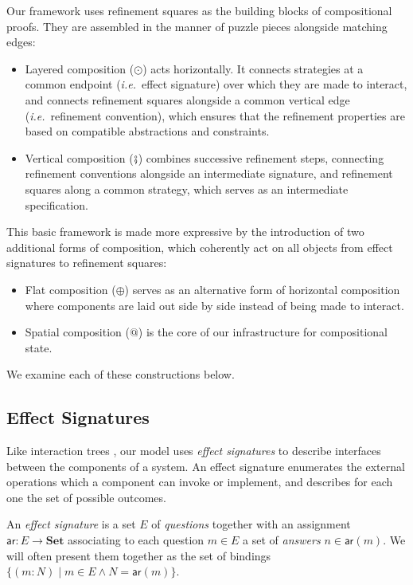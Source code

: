 \documentclass[acmsmall,nonacm]{acmart}
\newcommand{\kw}[1]{\ensuremath{ \mathsf{#1} }}
\begin{document}
Our framework uses
refinement squares as the building blocks of compositional proofs.
They are assembled in the manner of puzzle pieces
alongside matching edges:
\begin{itemize}
\item Layered composition ($\odot$) acts horizontally.
  It connects strategies at a common endpoint (\emph{i.e.}~effect signature)
  over which they are made to interact,
  and connects refinement squares alongside a common
  vertical edge (\emph{i.e.}~refinement convention),
  which ensures that the refinement properties
  are based on compatible abstractions and constraints.
\item Vertical composition ($\fatsemi$)
  combines successive refinement steps,
  connecting refinement conventions alongside an intermediate signature,
  and refinement squares along a common strategy,
  which serves as an intermediate specification.
\end{itemize}
This basic framework is made more expressive
by the introduction of two additional forms of composition,
which coherently act on all objects from effect signatures to refinement squares:
\begin{itemize}
\item Flat composition ($\oplus$)
  serves as an alternative form of horizontal composition
  where components are laid out side by side
  instead of being made to interact.
\item Spatial composition ($\mathbin@$)
  is the core of our infrastructure
  for compositional state.
\end{itemize}
We examine each of these constructions below.



\subsection{Effect Signatures} \label{sec:esig} %

Like interaction trees \cite{itrees},
our model uses \emph{effect signatures}
to describe interfaces between the components of a system.
An effect signature enumerates
the external operations which
a component can invoke or implement,
and describes for each one
the set of possible outcomes.

\begin{definition} \label{def:esig}
An \emph{effect signature} is a set $E$ of \emph{questions}
together with an assignment $\kw{ar} : E \rightarrow \mathbf{Set}$
associating to each question $m \in E$
a set of \emph{answers} $n \in \kw{ar}(m)$.
We will often present them together as the set of bindings
$\{ (m \mathbin: N) \mid m \in E \wedge N = \kw{ar}(m) \}$.
\end{definition}
\end{document}
